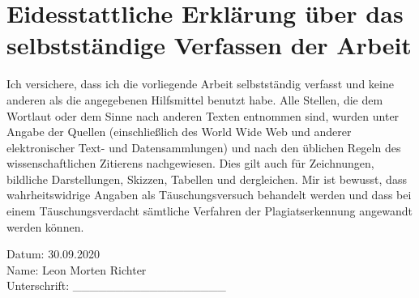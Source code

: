 \newpage
\section{Eidesstattliche Erklärung über das selbstständige Verfassen der Arbeit}
\noindent Ich versichere, dass ich die vorliegende Arbeit selbstständig verfasst und keine anderen als die angegebenen Hilfsmittel benutzt habe. Alle Stellen, die dem Wortlaut oder dem Sinne nach anderen Texten entnommen sind, wurden unter Angabe der Quellen (einschließlich des World Wide Web und anderer elektronischer Text- und Datensammlungen) und nach den üblichen Regeln des wissenschaftlichen Zitierens nachgewiesen. Dies gilt auch für Zeichnungen, bildliche Darstellungen, Skizzen, Tabellen und dergleichen. Mir ist bewusst, dass wahrheitswidrige Angaben als Täuschungsversuch behandelt werden und dass bei einem Täuschungsverdacht sämtliche Verfahren der Plagiatserkennung angewandt werden können.
\newline
\newline
\newline

\noindent Datum: 30.09.2020 \\
Name:  Leon Morten Richter \\
Unterschrift: \_\_\_\_\_\_\_\_\_\_\_\_\_\_\_\_\_\_
